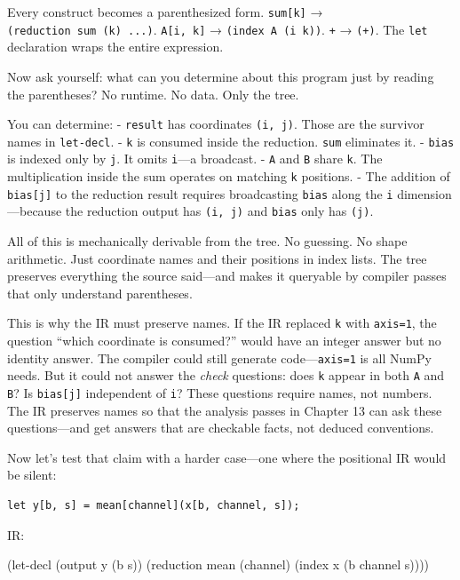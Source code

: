 \documentclass[11pt,titlepage]{article}
\newenvironment{Shaded}{}{}
\newcommand{\NormalTok}[1]{#1}
\begin{document}
Every construct becomes a parenthesized form. \texttt{sum{[}k{]}} →
\texttt{(reduction\ sum\ (k)\ ...)}. \texttt{A{[}i,\ k{]}} →
\texttt{(index\ A\ (i\ k))}. \texttt{+} → \texttt{(+)}. The \texttt{let}
declaration wraps the entire expression.

Now ask yourself: what can you determine about this program just by
reading the parentheses? No runtime. No data. Only the tree.

You can determine: - \texttt{result} has coordinates \texttt{(i,\ j)}.
Those are the survivor names in \texttt{let-decl}. - \texttt{k} is
consumed inside the reduction. \texttt{sum} eliminates it. -
\texttt{bias} is indexed only by \texttt{j}. It omits \texttt{i}---a
broadcast. - \texttt{A} and \texttt{B} share \texttt{k}. The
multiplication inside the sum operates on matching \texttt{k} positions.
- The addition of \texttt{bias{[}j{]}} to the reduction result requires
broadcasting \texttt{bias} along the \texttt{i} dimension---because the
reduction output has \texttt{(i,\ j)} and \texttt{bias} only has
\texttt{(j)}.

All of this is mechanically derivable from the tree. No guessing. No
shape arithmetic. Just coordinate names and their positions in index
lists. The tree preserves everything the source said---and makes it
queryable by compiler passes that only understand parentheses.

This is why the IR must preserve names. If the IR replaced \texttt{k}
with \texttt{axis=1}, the question ``which coordinate is consumed?''
would have an integer answer but no identity answer. The compiler could
still generate code---\texttt{axis=1} is all NumPy needs. But it could
not answer the \emph{check} questions: does \texttt{k} appear in both
\texttt{A} and \texttt{B}? Is \texttt{bias{[}j{]}} independent of
\texttt{i}? These questions require names, not numbers. The IR preserves
names so that the analysis passes in Chapter 13 can ask these
questions---and get answers that are checkable facts, not deduced
conventions.

Now let's test that claim with a harder case---one where the positional
IR would be silent:

\begin{verbatim}
let y[b, s] = mean[channel](x[b, channel, s]);
\end{verbatim}

IR:

\begin{Shaded}
\begin{Highlighting}[]
\NormalTok{(let-decl (output y (b s))}
\NormalTok{  (reduction mean (channel)}
\NormalTok{    (index x (b channel s))))}
\end{Highlighting}
\end{Shaded}
\end{document}
